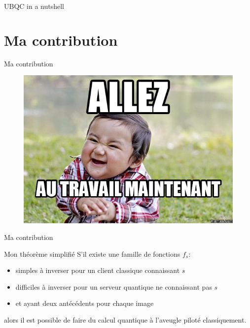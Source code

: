 \documentclass[]{beamer}
\begin{document}
\begin{frame}{UBQC in a nutshell}
  \begin{figure}[ht]
    \centering
  \end{figure}
\end{frame}

\section{Ma contribution}

\begin{frame}{Ma contribution}
    \begin{figure}[ht]
      \centering
      \includegraphics[width=\textwidth,height=0.8\textheight,keepaspectratio]{figures/au_travail.jpg}
    \end{figure}
\end{frame}


\begin{frame}{Ma contribution}
  \begin{block}{Mon théorème simplifié}
    S'il existe une famille de fonctions $f_s$:
    \begin{itemize}
    \item simples à inverser pour un client classique connaissant $s$
    \item difficiles à inverser pour un serveur quantique ne connaissant pas $s$
    \item et ayant deux antécédents pour chaque image
    \end{itemize}
    alors il est possible de faire du calcul quantique à l'aveugle piloté classiquement.
  \end{block}
\end{frame}
\end{document}
